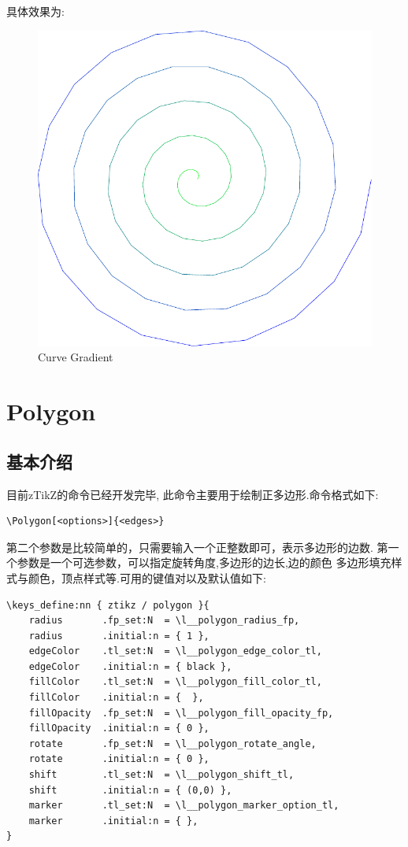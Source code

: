 具体效果为:
\begin{figure}[!htb]
  \centering
  \includegraphics[width=.6\linewidth]{./pics/curve_gradient.pdf}
  \caption{Curve Gradient}
  \label{fig:curve-gradient}
\end{figure}

\section{Polygon}
\subsection{基本介绍}
目前zTikZ的命令已经开发完毕, 此命令主要用于绘制正多边形.命令格式如下:
\begin{verbatim}
\Polygon[<options>]{<edges>}
\end{verbatim}

第二个参数是比较简单的，只需要输入一个正整数即可，表示多边形的边数. 第一个参数是一个可选参数，可以指定旋转角度,多边形的边长,边的颜色
多边形填充样式与颜色，顶点样式等.可用的键值对以及默认值如下:

\begin{verbatim}
\keys_define:nn { ztikz / polygon }{
    radius       .fp_set:N  = \l__polygon_radius_fp,
    radius       .initial:n = { 1 },
    edgeColor    .tl_set:N  = \l__polygon_edge_color_tl,
    edgeColor    .initial:n = { black },
    fillColor    .tl_set:N  = \l__polygon_fill_color_tl,
    fillColor    .initial:n = {  },
    fillOpacity  .fp_set:N  = \l__polygon_fill_opacity_fp,
    fillOpacity  .initial:n = { 0 },
    rotate       .fp_set:N  = \l__polygon_rotate_angle,
    rotate       .initial:n = { 0 },
    shift        .tl_set:N  = \l__polygon_shift_tl,
    shift        .initial:n = { (0,0) },
    marker       .tl_set:N  = \l__polygon_marker_option_tl,
    marker       .initial:n = { },
}
\end{verbatim}

